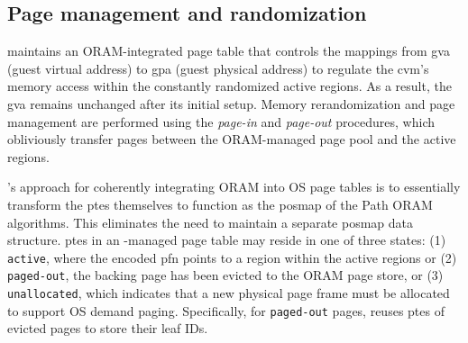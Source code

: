\subsection{Page management and randomization}
\label{subsec:paging-in-out}
\thename maintains an ORAM-integrated page table that controls the mappings from \gls{gva} (guest virtual address) to \gls{gpa} (guest physical address) to regulate the \gls{cvm}'s memory access within the constantly randomized active regions.
As a result, the \gls{gva} remains unchanged after its initial setup.
Memory rerandomization and page management are performed using the \emph{page-in} and \emph{page-out} procedures, which obliviously transfer pages between the ORAM-managed page pool and the active regions.




\thename's approach for coherently integrating ORAM into OS page tables is to essentially transform the \glspl{pte} themselves to function as the \gls{posmap} of the Path ORAM algorithms.
This eliminates the need to maintain a separate \gls{posmap} data structure.
\glspl{pte} in an \thename-managed page table may reside in one of three states: (1) \texttt{active}, where the encoded \gls{pfn} points to a region within the active regions or (2) \texttt{paged-out}, the backing page has been evicted to the ORAM page store, or (3) \texttt{unallocated}, which indicates that a new physical page frame must be allocated to support OS demand paging.
Specifically, for \texttt{paged-out} pages, \thename reuses \glspl{pte} of evicted pages to store their leaf IDs.





